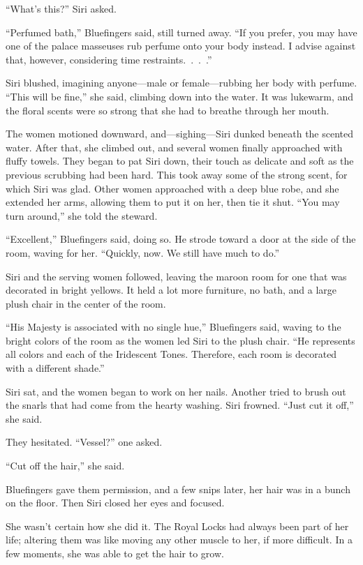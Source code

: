 “What’s this?” Siri asked.

“Perfumed bath,” Bluefingers said, still turned away. “If you prefer, you may have one of the palace masseuses rub perfume onto your body instead. I advise against that, however, considering time restraints.~.~.~.”

Siri blushed, imagining anyone—male or female—rubbing her body with perfume. “This will be fine,” she said, climbing down into the water. It was lukewarm, and the floral scents were so strong that she had to breathe through her mouth.

The women motioned downward, and—sighing—Siri dunked beneath the scented water. After that, she climbed out, and several women finally approached with fluffy towels. They began to pat Siri down, their touch as delicate and soft as the previous scrubbing had been hard. This took away some of the strong scent, for which Siri was glad. Other women approached with a deep blue robe, and she extended her arms, allowing them to put it on her, then tie it shut. “You may turn around,” she told the steward.

“Excellent,” Bluefingers said, doing so. He strode toward a door at the side of the room, waving for her. “Quickly, now. We still have much to do.”

Siri and the serving women followed, leaving the maroon room for one that was decorated in bright yellows. It held a lot more furniture, no bath, and a large plush chair in the center of the room.

“His Majesty is associated with no single hue,” Bluefingers said, waving to the bright colors of the room as the women led Siri to the plush chair. “He represents all colors and each of the Iridescent Tones. Therefore, each room is decorated with a different shade.”

Siri sat, and the women began to work on her nails. Another tried to brush out the snarls that had come from the hearty washing. Siri frowned. “Just cut it off,” she said.

They hesitated. “Vessel?” one asked.

“Cut off the hair,” she said.

Bluefingers gave them permission, and a few snips later, her hair was in a bunch on the floor. Then Siri closed her eyes and focused.

She wasn’t certain how she did it. The Royal Locks had always been part of her life; altering them was like moving any other muscle to her, if more difficult. In a few moments, she was able to get the hair to grow.

